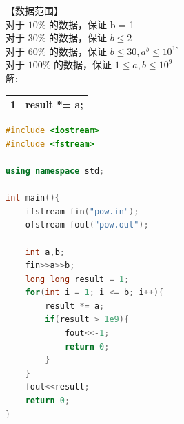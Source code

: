 \documentclass[12pt,twiside,a4paper]{ctexbook}
\numberwithin{chapter}{part}
\begin{document}
【数据范围】\\
对于 $10\%$ 的数据，保证 b = 1\\
对于 $30\%$ 的数据，保证 $b \leq 2$\\
对于 $60\%$ 的数据，保证 $b \leq 30, a^b \leq 10^{18}$\\
对于 $100\%$ 的数据，保证 $1 \leq a, b \leq 10^9$\\
解:\\
\begin{tabular}{|c|c|}
\hline
1 & result *= a;\\
\hline
\end{tabular}
\begin{lstlisting}[language=C++]
#include <iostream>
#include <fstream>

using namespace std;

int main(){
	ifstream fin("pow.in");
	ofstream fout("pow.out");

	int a,b;
	fin>>a>>b;
	long long result = 1;
	for(int i = 1; i <= b; i++){
		result *= a;
		if(result > 1e9){
			fout<<-1;
			return 0;
		}
	}
	fout<<result;
	return 0;
}
\end{lstlisting}
\end{document}
